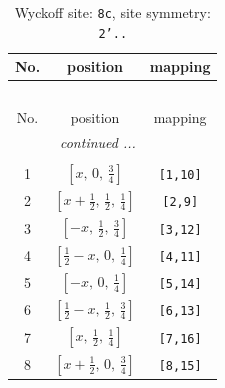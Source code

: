 \documentclass[fleqn,8pt]{jsarticle}
\begin{document}
\begin{longtable}{ccc}
\caption{Wyckoff site: {\tt 8c}, site symmetry: {\tt 2'..}}
 \\
 \hline \hline
No. & position & mapping \\ \hline \endfirsthead

\multicolumn{2}{l}{\tablename\ \thetable{}} \\
 \hline \hline
No. & position & mapping \\ \hline \endhead

 \hline \hline
\multicolumn{2}{r}{\footnotesize\it continued ...} \\ \endfoot

 \hline \hline
\multicolumn{2}{r}{} \\ \endlastfoot

1 & $\left[ x,\, 0,\, \frac{3}{4} \right]$ & {\tt [1,10]} \\ \hline
2 & $\left[ x + \frac{1}{2},\, \frac{1}{2},\, \frac{1}{4} \right]$ & {\tt [2,9]} \\ \hline
3 & $\left[ - x,\, \frac{1}{2},\, \frac{3}{4} \right]$ & {\tt [3,12]} \\ \hline
4 & $\left[ \frac{1}{2} - x,\, 0,\, \frac{1}{4} \right]$ & {\tt [4,11]} \\ \hline
5 & $\left[ - x,\, 0,\, \frac{1}{4} \right]$ & {\tt [5,14]} \\ \hline
6 & $\left[ \frac{1}{2} - x,\, \frac{1}{2},\, \frac{3}{4} \right]$ & {\tt [6,13]} \\ \hline
7 & $\left[ x,\, \frac{1}{2},\, \frac{1}{4} \right]$ & {\tt [7,16]} \\ \hline
8 & $\left[ x + \frac{1}{2},\, 0,\, \frac{3}{4} \right]$ & {\tt [8,15]} \\
\end{longtable}
\renewcommand{\arraystretch}{1.2}
\end{document}

